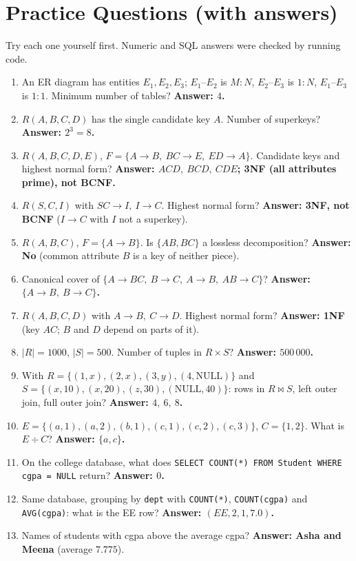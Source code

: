 \documentclass[11pt,a4paper]{article}
\begin{document}
\section{Practice Questions (with answers)}
Try each one yourself first. Numeric and SQL answers were checked by running code.
\begin{enumerate}[leftmargin=*,itemsep=4pt]
\item An ER diagram has entities $E_1,E_2,E_3$; $E_1$--$E_2$ is $M{:}N$, $E_2$--$E_3$ is $1{:}N$, $E_1$--$E_3$ is $1{:}1$. Minimum number of tables? \textbf{Answer: $4$.}
\item $R(A,B,C,D)$ has the single candidate key $A$. Number of superkeys? \textbf{Answer: $2^3=8$.}
\item $R(A,B,C,D,E)$, $F=\{A\to B,\ BC\to E,\ ED\to A\}$. Candidate keys and highest normal form? \textbf{Answer: $ACD,\ BCD,\ CDE$; 3NF (all attributes prime), not BCNF.}
\item $R(S,C,I)$ with $SC\to I,\ I\to C$. Highest normal form? \textbf{Answer: 3NF, not BCNF} ($I\to C$ with $I$ not a superkey).
\item $R(A,B,C)$, $F=\{A\to B\}$. Is $\{AB,BC\}$ a lossless decomposition? \textbf{Answer: No} (common attribute $B$ is a key of neither piece).
\item Canonical cover of $\{A\to BC,\ B\to C,\ A\to B,\ AB\to C\}$? \textbf{Answer: $\{A\to B,\ B\to C\}$.}
\item $R(A,B,C,D)$ with $A\to B,\ C\to D$. Highest normal form? \textbf{Answer: 1NF} (key $AC$; $B$ and $D$ depend on parts of it).
\item $|R|=1000$, $|S|=500$. Number of tuples in $R\times S$? \textbf{Answer: $500\,000$.}
\item With $R=\{(1,x),(2,x),(3,y),(4,\text{NULL})\}$ and $S=\{(x,10),(x,20),(z,30),(\text{NULL},40)\}$: rows in $R\bowtie S$, left outer join, full outer join? \textbf{Answer: $4,\ 6,\ 8$.}
\item $E=\{(a,1),(a,2),(b,1),(c,1),(c,2),(c,3)\}$, $C=\{1,2\}$. What is $E\div C$? \textbf{Answer: $\{a,c\}$.}
\item On the college database, what does \texttt{SELECT COUNT(*) FROM Student WHERE cgpa = NULL} return? \textbf{Answer: $0$.}
\item Same database, grouping by \texttt{dept} with \texttt{COUNT(*)}, \texttt{COUNT(cgpa)} and \texttt{AVG(cgpa)}: what is the EE row? \textbf{Answer: $(EE,2,1,7.0)$.}
\item Names of students with cgpa above the average cgpa? \textbf{Answer: Asha and Meena} (average $7.775$).

\end{enumerate}
\end{document}
